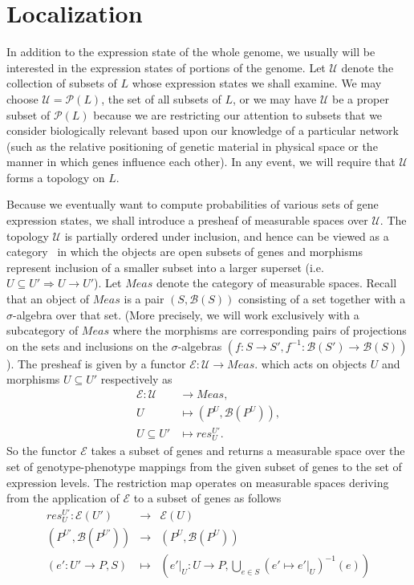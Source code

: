 \section{Localization}

In addition to the expression state of the whole genome, we usually will be interested in the expression states of portions of the genome.  Let $\mathcal{U}$ denote the collection of subsets of $L$ whose expression states we shall examine.  We may choose $\mathcal{U} = \mathcal{P}(L)$, the set of all subsets of $L$, or we may have $\mathcal{U}$ be a proper subset of $\mathcal{P}(L)$ because we are restricting our attention to subsets that we consider biologically relevant based upon our knowledge of a particular network (such as the relative positioning of genetic material in physical space or the manner in which genes influence each other).  In any event, we will require that $\mathcal{U}$ forms a topology on $L$.

Because we eventually want to compute probabilities of various sets of gene expression states, we shall introduce a presheaf of measurable spaces over $\mathcal{U}$.  The topology $\mathcal{U}$ is partially ordered under inclusion, and hence can be viewed as a category~\cite{Lane1998,MacLane1992,Awodey2006} in which the objects are open subsets of genes and morphisms represent inclusion of a smaller subset into a larger superset (i.e. $U \subseteq U' \Rightarrow U \rightarrow U'$).  Let $\mathit{Meas}$ denote the category of measurable spaces.  Recall that an object of $Meas$ is a pair $(S,\mathcal{B}(S))$ consisting of a set together with a $\sigma$-algebra over that set.  (More precisely, we will work exclusively with a subcategory of $Meas$ where the morphisms are corresponding pairs of projections on the sets and inclusions on the $\sigma$-algebras $(f:S \rightarrow S', f^{-1} : \mathcal{B}(S') \rightarrow \mathcal{B}(S))$).  The presheaf is given by a functor $\mathcal{E} \colon \mathcal{U} \rightarrow Meas.$ which acts on objects $U$ and morphisms $U \subseteq U'$ respectively as
\begin{equation}\label{eq:gpfunctor}
\begin{split}
\mathcal{E} \colon \mathcal{U} &\rightarrow Meas,\\
U &\mapsto (P^U, \mathcal{B}(P^U)),\\
U \subseteq U' &\mapsto res^{U'}_{U}.
\end{split}
\end{equation}
So the functor $\mathcal{E}$ takes a subset of genes and returns a measurable space over the set of genotype-phenotype mappings from the given subset of genes to the set of expression levels. The restriction map operates on measurable spaces deriving from the application of $\mathcal{E}$ to a subset of genes as follows
\begin{eqnarray*}
res^{U'}_{U} \colon \mathcal{E}(U') &\rightarrow& \mathcal{E}(U)\\
(P^{U'},\mathcal{B}(P^{U'})) &\rightarrow& (P^U,\mathcal{B}(P^U))\\
(e' \colon U' \rightarrow P, S) &\mapsto& (e'|_U \colon U \rightarrow P, \bigcup_{e \in S}(e' \mapsto e'|_U)^{-1}(e))
\end{eqnarray*}


